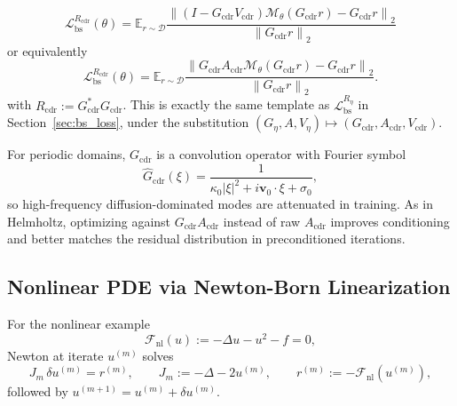 \documentclass{article}
\providecommand{\E}{\mathbb{E}}
\newcommand{\norm}[1]{\left\lVert #1 \right\rVert_2}
\theoremstyle{plain}
\theoremstyle{remark}
\begin{document}
\begin{equation}
\mathcal{L}_{\mathrm{bs}}^{R_{\mathrm{cdr}}}(\theta)
=
\E_{r\sim\mathcal{D}}
\frac{
\norm{
(I-G_{\mathrm{cdr}}V_{\mathrm{cdr}})
\mathcal{M}_\theta(G_{\mathrm{cdr}}r)
-G_{\mathrm{cdr}}r
}
}{
\norm{G_{\mathrm{cdr}}r}
}
\label{eq:cdr_bs_loss}
\end{equation}
or equivalently
\begin{equation}
\mathcal{L}_{\mathrm{bs}}^{R_{\mathrm{cdr}}}(\theta)
=
\E_{r\sim\mathcal{D}}
\frac{
\norm{
G_{\mathrm{cdr}}A_{\mathrm{cdr}}
\mathcal{M}_\theta(G_{\mathrm{cdr}}r)
-G_{\mathrm{cdr}}r
}
}{
\norm{G_{\mathrm{cdr}}r}
}.
\label{eq:cdr_bs_loss_eq}
\end{equation}
with $R_{\mathrm{cdr}}:=G_{\mathrm{cdr}}^\ast G_{\mathrm{cdr}}$. This is exactly the same template as $\mathcal{L}_{\mathrm{bs}}^{R_\eta}$ in Section~\ref{sec:bs_loss}, under the substitution $(G_\eta,A,V_\eta)\mapsto(G_{\mathrm{cdr}},A_{\mathrm{cdr}},V_{\mathrm{cdr}})$.

For periodic domains, $G_{\mathrm{cdr}}$ is a convolution operator with Fourier symbol
\begin{equation}
\widehat{G}_{\mathrm{cdr}}(\xi)
=
\frac{1}{\kappa_0|\xi|^2+i\mathbf{v}_0\cdot\xi+\sigma_0},
\label{eq:cdr_G_symbol}
\end{equation}
so high-frequency diffusion-dominated modes are attenuated in training. As in Helmholtz, optimizing against $G_{\mathrm{cdr}}A_{\mathrm{cdr}}$ instead of raw $A_{\mathrm{cdr}}$ improves conditioning and better matches the residual distribution in preconditioned iterations.

\subsection{Nonlinear PDE via Newton-Born Linearization}
For the nonlinear example
\begin{equation}
\mathcal{F}_{\mathrm{nl}}(u):=-\Delta u-u^2-f=0,
\label{eq:nonlinear_residual}
\end{equation}
Newton at iterate $u^{(m)}$ solves
\begin{equation}
J_m\,\delta u^{(m)} = r^{(m)},
\qquad
J_m:=-\Delta-2u^{(m)},
\qquad
r^{(m)}:=-\mathcal{F}_{\mathrm{nl}}(u^{(m)}),
\label{eq:newton_linear_system}
\end{equation}
followed by $u^{(m+1)}=u^{(m)}+\delta u^{(m)}$.
\end{document}

